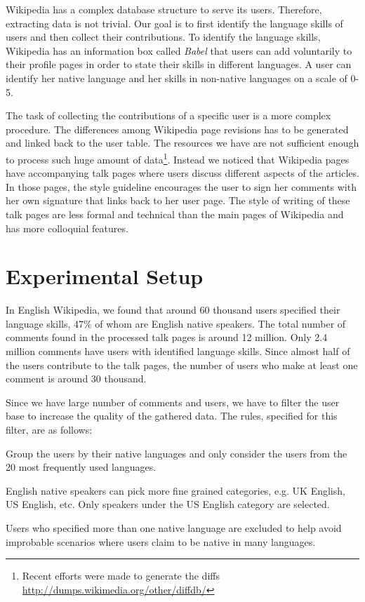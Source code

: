 \documentclass[10pt,a5paper,twoside]{article}
\begin{document}
Wikipedia has a complex database structure to serve its users.
Therefore, extracting data is not trivial. Our goal is to first identify the
language skills of users and then collect their contributions. To identify the
language skills, Wikipedia has an information box called \emph{Babel} that users can
add voluntarily to their profile pages in order to state their skills in different
languages. A user can identify her native language
and her skills in non-native languages on a scale of 0-5.

The task of collecting the contributions of a specific user is a more complex
procedure. The differences among Wikipedia page revisions has to be generated and
linked back to the user table. The resources we have are not sufficient enough to process such
huge amount of data\footnote{Recent efforts were
made to generate the diffs \url{http://dumps.wikimedia.org/other/diffdb/}}.
Instead we noticed that Wikipedia pages have accompanying talk pages where
users discuss different aspects of the articles. In those pages, the style
guideline encourages the user to sign her comments with her own signature that
links back to her user page. The style of writing of these
talk pages are less formal and technical than the main pages of Wikipedia and
has more colloquial features.

\section{Experimental Setup}
\label{setup}
In English Wikipedia, we found that around 60 thousand users specified their language skills, 47\% of
whom are English native speakers. The total number of comments found in the
processed talk pages is around 12 million. Only 2.4 million comments have
users with identified language skills. Since almost half of the users contribute to the
talk pages, the number of users who make at least one comment is around 30 thousand.

Since we have large number of comments and users, we have to filter the user
base to increase the quality of the gathered data. The rules, specified for this
filter, are as follows:
\begin{compactitem}
\item Group the users by their native languages and only consider the
users from the 20 most frequently used languages.
\item English native speakers can pick more fine grained categories, e.g. UK
English, US English, etc. Only
  speakers under the US English category are selected.
\item Users who specified more than one native language are excluded to help
avoid improbable scenarios where users claim to be native in many
languages.
\end{compactitem}
\end{document}
